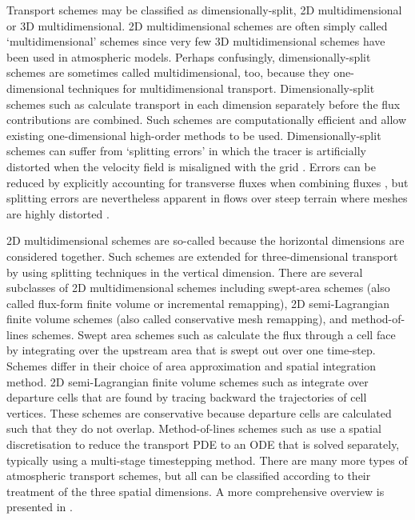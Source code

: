 Transport schemes may be classified as dimensionally-split, 2D multidimensional or 3D multidimensional.  2D multidimensional schemes are often simply called `multidimensional' schemes since very few 3D multidimensional schemes have been used in atmospheric models.
Perhaps confusingly, dimensionally-split schemes are sometimes called multidimensional, too, because they one-dimensional techniques for multidimensional transport.
Dimensionally-split schemes such as \citep{lin-rood1996,putman-lin2007,katta2015} calculate transport in each dimension separately before the flux contributions are combined.  Such schemes are computationally efficient and allow existing one-dimensional high-order methods to be used.
  Dimensionally-split schemes can suffer from `splitting errors' in which the tracer is artificially distorted when the velocity field is misaligned with the grid \citep{leonard1993}.  Errors can be reduced by explicitly accounting for transverse fluxes when combining fluxes \citep{leonard1996}, but splitting errors are nevertheless apparent in flows over steep terrain where meshes are highly distorted \citep{weller2017}.

2D multidimensional schemes are so-called because the horizontal dimensions are considered together.  Such schemes are extended for three-dimensional transport by using splitting techniques in the vertical dimension.
There are several subclasses of 2D multidimensional schemes including swept-area schemes (also called flux-form finite volume or incremental remapping), 2D semi-Lagrangian finite volume schemes (also called conservative mesh remapping), and method-of-lines schemes.
Swept area schemes such as \citep{lashley2002,skamarock-menchaca2010,lauritzen2011,thuburn2014} calculate the flux through a cell face by integrating over the upstream area that is swept out over one time-step.  Schemes differ in their choice of area approximation and spatial integration method.
2D semi-Lagrangian finite volume schemes such as \citep{iske-kaeser2004,lauritzen2010} integrate over departure cells that are found by tracing backward the trajectories of cell vertices.  These schemes are conservative because departure cells are calculated such that they do not overlap.
Method-of-lines schemes such as \citep{weller2009,skamarock-gassmann2011} use a spatial discretisation to reduce the transport PDE to an ODE that is solved separately, typically using a multi-stage timestepping method.
There are many more types of atmospheric transport schemes, but all can be classified according to their treatment of the three spatial dimensions.  A more comprehensive overview is presented in \cite{lauritzen2014}.


